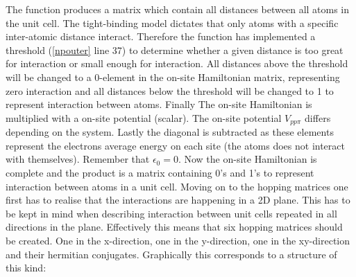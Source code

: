 \vspace{-1\baselineskip}
\vspace{\baselineskip}
The function produces a matrix which contain all distances between all atoms in the unit cell. The tight-binding model dictates that only atoms with a specific inter-atomic distance interact. Therefore the function has implemented a threshold (\cref{npouter} line 37) to determine whether a given distance is too great for interaction or small enough for interaction. All distances above the threshold will be changed to a 0-element in the on-site Hamiltonian matrix, representing zero interaction and all distances below the threshold will be changed to 1 to represent interaction between atoms. Finally The on-site Hamiltonian is multiplied with a on-site potential (scalar). The on-site potential \(V_{pp\pi}\) differs depending on the system. Lastly the diagonal is subtracted as these elements represent the electrons average energy on each site (the atoms does not interact with themselves). Remember that \(\epsilon_0 = 0\). Now the on-site Hamiltonian is complete and the product is a matrix containing 0's and 1's to represent interaction between atoms in a unit cell. \newline
Moving on to the hopping matrices one first has to realise that the interactions are happening in a 2D plane. This has to be kept in mind when describing interaction between unit cells repeated in all directions in the plane. Effectively this means that six hopping matrices should be created. One in the x-direction, one in the y-direction, one in the xy-direction and their hermitian conjugates. Graphically this corresponds to a structure of this kind:
